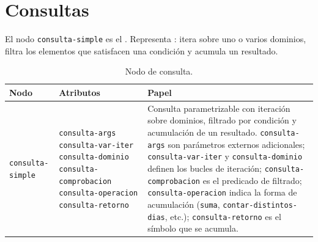 \documentclass[12pt,a4paper]{report}
\begin{document}


\section{Consultas}
\label{sec:consultas}

El nodo \texttt{consulta-simple} es el .  Representa : itera
sobre uno o varios dominios, filtra los elementos que satisfacen una
condición y acumula un resultado.


\begin{table}[h!]
\centering
\caption{Nodo de consulta.}
\label{tab:consulta}
\renewcommand{\arraystretch}{1.3}
\begin{tabular}{p{4.8cm} p{4.5cm} p{5.5cm}}
\hline
\textbf{Nodo} & \textbf{Atributos} & \textbf{Papel} \\
\hline
\texttt{consulta-simple}
  & \texttt{consulta-args}\newline
    \texttt{consulta-var-iter}\newline
    \texttt{consulta-dominio}\newline
    \texttt{consulta-comprobacion}\newline
    \texttt{consulta-operacion}\newline
    \texttt{consulta-retorno}
  & Consulta parametrizable con iteración sobre dominios,
    filtrado por condición y acumulación de un resultado.
    \texttt{consulta-args} son parámetros externos adicionales;
    \texttt{consulta-var-iter} y \texttt{consulta-dominio}
    definen los bucles de iteración;
    \texttt{consulta-comprobacion} es el predicado de filtrado;
    \texttt{consulta-operacion} indica la forma de acumulación
    (\texttt{suma}, \texttt{contar-distintos-dias}, etc.);
    \texttt{consulta-retorno} es el símbolo que se acumula. \\
\hline
\end{tabular}
\end{table}
\end{document}
